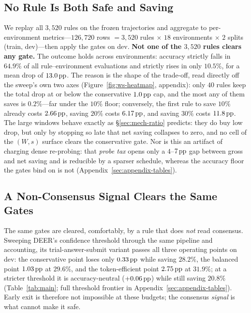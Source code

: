 \subsection{No Rule Is Both Safe and Saving}
\label{sec:exp-sweep}
We replay all $3{,}520$ rules on the frozen trajectories and aggregate to
per-environment metrics---$126{,}720$ rows $=3{,}520$ rules $\times$ $18$
environments $\times$ $2$ splits (train, dev)---then apply the gates on dev.
\textbf{Not one of the $3{,}520$ rules clears any gate.} The outcome holds
across environments: accuracy strictly falls in $64.9\%$ of all
rule--environment evaluations and strictly rises in only $10.5\%$, for a mean
drop of $13.0\,\text{pp}$. The reason is the shape of the trade-off, read directly off
the sweep's own two axes (Figure~\ref{fig:ws-heatmap}, appendix): only $40$
rules keep the total drop at or below the conservative $1.0\,\text{pp}$ cap, and the
most any of them saves is $0.2\%$---far under the $10\%$ floor; conversely, the
first rule to save $10\%$ already costs $2.66\,\text{pp}$, saving $20\%$ costs
$6.17\,\text{pp}$, and saving $30\%$ costs $11.8\,\text{pp}$. The large windows behave exactly
as \S\ref{sec:mech-ratio} predicts: they do buy low drop, but only by stopping
so late that net saving collapses to zero, and no cell of the $(W,s)$ surface
clears the conservative gate. Nor is this an artifact of charging dense
re-probing: that \emph{probe tax} opens only a $4$--$7\,\text{pp}$ gap between gross and
net saving and is reducible by a sparser schedule, whereas the accuracy floor
the gates bind on is not
(Appendix~\ref{sec:appendix-tables}).

\subsection{A Non-Consensus Signal Clears the Same Gates}
\label{sec:exp-deer}
The same gates are cleared, comfortably, by a rule that does \emph{not} read
consensus. Sweeping DEER's confidence threshold through the same
pipeline and accounting, its trial-answer-submit variant passes all three
operating points on dev: the conservative point loses only $0.33\,\text{pp}$ while
saving $28.2\%$, the balanced point $1.03\,\text{pp}$ at $29.6\%$, and the
token-efficient point $2.75\,\text{pp}$ at $31.9\%$; at a stricter threshold it is
accuracy-neutral ($+0.06\,\text{pp}$) while still saving $20.8\%$
(Table~\ref{tab:main}; full threshold frontier in Appendix~\ref{sec:appendix-tables}). Early exit is therefore not impossible at these
budgets; the consensus \emph{signal} is what cannot make it safe.

